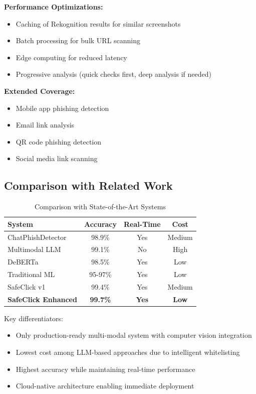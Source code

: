 \documentclass[conference]{IEEEtran}
\begin{document}
\textbf{Performance Optimizations:}
\begin{itemize}
\item Caching of Rekognition results for similar screenshots
\item Batch processing for bulk URL scanning
\item Edge computing for reduced latency
\item Progressive analysis (quick checks first, deep analysis if needed)
\end{itemize}

\textbf{Extended Coverage:}
\begin{itemize}
\item Mobile app phishing detection
\item Email link analysis
\item QR code phishing detection
\item Social media link scanning
\end{itemize}

\subsection{Comparison with Related Work}

\begin{table}[htbp]
\caption{Comparison with State-of-the-Art Systems}
\begin{center}
\begin{tabular}{|l|c|c|c|}
\hline
\textbf{System} & \textbf{Accuracy} & \textbf{Real-Time} & \textbf{Cost} \\
\hline
ChatPhishDetector \cite{koide2024chatphish} & 98.9\% & Yes & Medium \\
\hline
Multimodal LLM \cite{lee2024multimodal} & 99.1\% & No & High \\
\hline
DeBERTa \cite{mahendru2024securenet} & 98.5\% & Yes & Low \\
\hline
Traditional ML \cite{maturure2024hybrid} & 95-97\% & Yes & Low \\
\hline
SafeClick v1 & 99.4\% & Yes & Medium \\
\hline
\textbf{SafeClick Enhanced} & \textbf{99.7\%} & \textbf{Yes} & \textbf{Low} \\
\hline
\end{tabular}
\end{center}
\end{table}

Key differentiators:
\begin{itemize}
\item Only production-ready multi-modal system with computer vision integration
\item Lowest cost among LLM-based approaches due to intelligent whitelisting
\item Highest accuracy while maintaining real-time performance
\item Cloud-native architecture enabling immediate deployment
\end{itemize}
\end{document}
